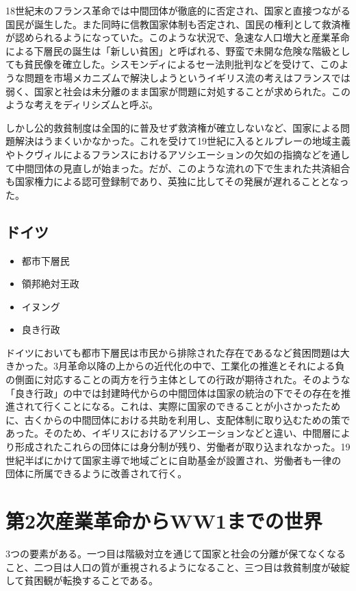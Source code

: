 \documentclass{jsarticle}
\begin{document}
18世紀末のフランス革命では中間団体が徹底的に否定され、国家と直接つながる国民が誕生した。また同時に信教国家体制も否定され、国民の権利として救済権が認められるようになっていた。このような状況で、急速な人口増大と産業革命による下層民の誕生は「新しい貧困」と呼ばれる、野蛮で未開な危険な階級としても貧民像を確立した。シスモンディによるセー法則批判などを受けて、このような問題を市場メカニズムで解決しようというイギリス流の考えはフランスでは弱く、国家と社会は未分離のまま国家が問題に対処することが求められた。このような考えをディリシズムと呼ぶ。

しかし公的救貧制度は全国的に普及せず救済権が確立しないなど、国家による問題解決はうまくいかなかった。これを受けて19世紀に入るとルプレーの地域主義やトクヴィルによるフランスにおけるアソシエーションの欠如の指摘などを通して中間団体の見直しが始まった。だが、このような流れの下で生まれた共済組合も国家権力による認可登録制であり、英独に比してその発展が遅れることとなった。

\subsection{ドイツ}
\begin{itemize}
	\item 都市下層民
	\item 領邦絶対王政
	\item イヌング
	\item 良き行政
\end{itemize}

ドイツにおいても都市下層民は市民から排除された存在であるなど貧困問題は大きかった。3月革命以降の上からの近代化の中で、工業化の推進とそれによる負の側面に対応することの両方を行う主体としての行政が期待された。そのような「良き行政」の中では封建時代からの中間団体は国家の統治の下でその存在を推進されて行くことになる。これは、実際に国家のできることが小さかったために、古くからの中間団体における共助を利用し、支配体制に取り込むための策であった。そのため、イギリスにおけるアソシエーションなどと違い、中間層により形成されたこれらの団体には身分制が残り、労働者が取り込まれなかった。19世紀半ばにかけて国家主導で地域ごとに自助基金が設置され、労働者も一律の団体に所属できるように改善されて行く。


\section{第2次産業革命からWW1までの世界}
3つの要素がある。一つ目は階級対立を通じて国家と社会の分離が保てなくなること、二つ目は人口の質が重視されるようになること、三つ目は救貧制度が破綻して貧困観が転換することである。
\end{document}
